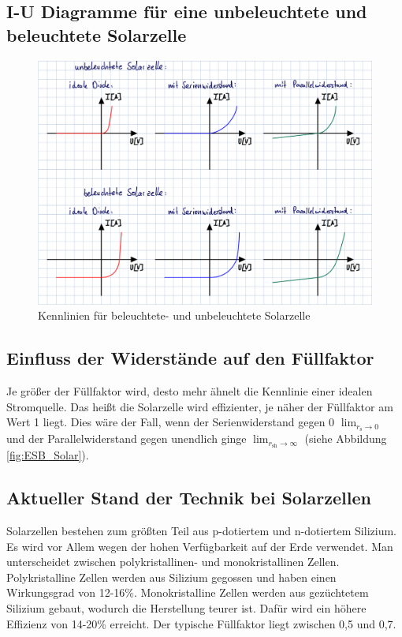 \documentclass[a4paper]{scrartcl}
\numberwithin{equation}{subsection}
\begin{document}
\subsection{I-U Diagramme für eine unbeleuchtete und beleuchtete Solarzelle}

\begin{figure}[H]
\includegraphics[width=14cm]{Kennlinie}
\centering
\caption{Kennlinien für beleuchtete- und unbeleuchtete Solarzelle}
\centering
\label{fig:Kennlinien}
\end{figure}

\subsection{Einfluss der Widerstände auf den Füllfaktor}
Je größer der Füllfaktor wird, desto mehr ähnelt die Kennlinie einer idealen Stromquelle. Das heißt die
Solarzelle wird effizienter, je näher der Füllfaktor am Wert 1 liegt. Dies wäre der Fall, wenn
der Serienwiderstand gegen 0 $\lim_{r_{\text{s}} \to 0}$ und der Parallelwiderstand gegen unendlich ginge
$\lim_{r_{\text{sh}} \to \infty}$ (siehe Abbildung \ref{fig:ESB_Solar}).

\subsection{Aktueller Stand der Technik bei Solarzellen}
Solarzellen bestehen zum größten Teil aus p-dotiertem und n-dotiertem Silizium.
Es wird vor Allem wegen der hohen Verfügbarkeit auf der Erde verwendet.
Man unterscheidet zwischen polykristallinen- und monokristallinen Zellen.
Polykristalline Zellen werden aus Silizium gegossen und haben einen Wirkungsgrad
von 12-16\%. Monokristalline Zellen werden aus gezüchtetem Silizium gebaut, wodurch die Herstellung teurer ist. Dafür wird ein höhere Effizienz
von 	14-20\% erreicht. Der typische Füllfaktor liegt zwischen 0,5 und 0,7.
\end{document}
